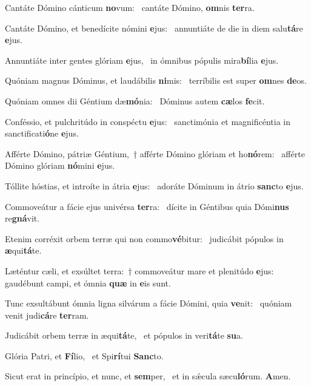 \item Cantáte Dómino cánticum \textbf{no}vum:~\psstar{} cantáte Dómino, \textbf{om}nis \textbf{ter}ra.

\item Cantáte Dómino, et benedícite nómini \textbf{e}jus:~\psstar{} annuntiáte de die in diem salu\textbf{tá}re \textbf{e}jus.

\item Annuntiáte inter gentes glóriam \textbf{e}jus,~\psstar{} in ómnibus pópulis mira\textbf{bí}lia \textbf{e}jus.

\item Quóniam magnus Dóminus, et laudábilis \textbf{ni}mis:~\psstar{} terríbilis est super \textbf{om}nes \textbf{de}os.

\item Quóniam omnes dii Géntium dæ\textbf{mó}nia:~\psstar{} Dóminus autem \textbf{cæ}los \textbf{fe}cit.

\item Conféssio, et pulchritúdo in conspéctu \textbf{e}jus:~\psstar{} sanctimónia et magnificéntia in sanctificati\textbf{ó}ne \textbf{e}jus.

\item Afférte Dómino, pátriæ Géntium,~† afférte Dómino glóriam et ho\textbf{nó}rem:~\psstar{} afférte Dómino glóriam \textbf{nó}mini \textbf{e}jus.

\item Tóllite hóstias, et introíte in átria \textbf{e}jus:~\psstar{} adoráte Dóminum in átrio \textbf{sanc}to \textbf{e}jus.

\item Commoveátur a fácie ejus univérsa \textbf{ter}ra:~\psstar{} dícite in Géntibus quia Dómi\textbf{nus} re\textbf{gná}vit.

\item Etenim corréxit orbem terræ qui non commo\textbf{vé}bitur:~\psstar{} judicábit pópulos in \textbf{æ}qui\textbf{tá}te.

\item Læténtur cæli, et exsúltet terra:~† commoveátur mare et plenitúdo \textbf{e}jus:~\psstar{} gaudébunt campi, et ómnia \textbf{quæ} in \textbf{e}is sunt.

\item Tunc exsultábunt ómnia ligna silvárum a fácie Dómini, quia \textbf{ve}nit:~\psstar{} quóniam venit judi\textbf{cá}re \textbf{ter}ram.

\item Judicábit orbem terræ in æqui\textbf{tá}te,~\psstar{} et pópulos in veri\textbf{tá}te \textbf{su}a.

\item Glória Patri, et \textbf{Fí}lio,~\psstar{} et Spi\textbf{rí}tui \textbf{Sanc}to.

\item Sicut erat in princípio, et nunc, et \textbf{sem}per,~\psstar{} et in sǽcula sæcu\textbf{ló}rum. \textbf{A}men.
